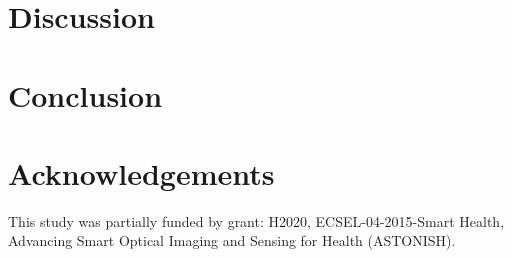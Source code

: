 \documentclass[12pt ]{iopart}
\begin{document}
\section{Discussion}

\section{Conclusion}

\section{Acknowledgements}
This study was partially funded by grant: H2020, ECSEL-04-2015-Smart Health, Advancing Smart Optical Imaging and Sensing for Health (ASTONISH).
 

\newpage
\printbibliography
 \cleardoublepage
{}
\end{document}
